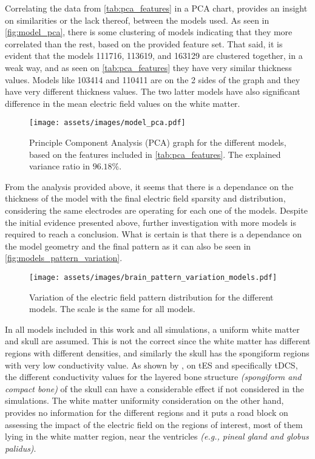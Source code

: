 Correlating the data from \autoref{tab:pca_features} in a \gls{PCA} chart, provides an insight on similarities or the lack thereof, between the models used. As seen in \autoref{fig:model_pca}, there is some clustering of models indicating that they more correlated than the rest, based on the provided feature set. That said, it is evident that the models 111716, 113619, and 163129 are clustered together, in a weak way, and as seen on \autoref{tab:pca_features} they have very similar thickness values. Models like 103414 and 110411 are on the 2 sides of the graph and they have very different thickness values. The two latter models have also significant difference in the mean electric field values on the white matter.

\begin{figure}[H]
    \centering
    \texttt{[image: assets/images/model\_pca.pdf]}
    \caption{Principle Component Analysis (PCA) graph for the different models, based on the features included in \autoref{tab:pca_features}. The explained variance ratio in $\boldsymbol{96.18\%}$.}
    \label{fig:model_pca}
\end{figure}

From the analysis provided above, it seems that there is a dependance on the thickness of the model with the final electric field sparsity and distribution, considering the same electrodes are operating for each one of the models. Despite the initial evidence presented above, further investigation with more models is required to reach a conclusion. What is certain is that there is a dependance on the model geometry and the final pattern as it can also be seen in \autoref{fig:models_pattern_variation}.

\begin{figure}[H]
    \centering
    \texttt{[image: assets/images/brain\_pattern\_variation\_models.pdf]}
    \caption{Variation of the electric field pattern distribution for the different models. The scale is the same for all models.}
    \label{fig:models_pattern_variation}
\end{figure}

In all models included in this work and all simulations, a uniform white matter and skull are assumed. This is not the correct since the white matter has different regions with different densities, and similarly the skull has the spongiform regions with very low conductivity value. As shown by , on \gls{tES} and specifically \gls{tDCS}, the different conductivity values for the layered bone structure \textit{(spongiform and compact bone)} of the skull can have a considerable effect if not considered in the simulations. The white matter uniformity consideration on the other hand, provides no information for the different regions and it puts a road block on assessing the impact of the electric field on the regions of interest, most of them lying in the white matter region, near the ventricles \textit{(e.g., pineal gland and globus palidus)}.


